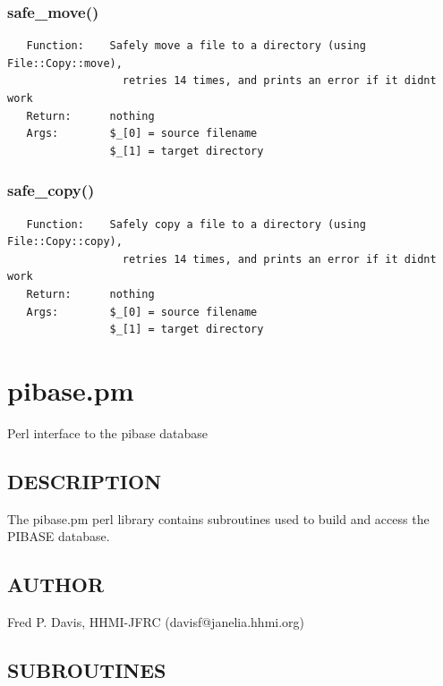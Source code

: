 \documentclass{article}
\begin{document}
\subsubsection*{safe\_move()\label{pibase_pm_safe_move_}}
\begin{verbatim}
   Function:    Safely move a file to a directory (using File::Copy::move),
                  retries 14 times, and prints an error if it didnt work
   Return:      nothing
   Args:        $_[0] = source filename
                $_[1] = target directory
\end{verbatim}
\subsubsection*{safe\_copy()\label{pibase_pm_safe_copy_}}
\begin{verbatim}
   Function:    Safely copy a file to a directory (using File::Copy::copy),
                  retries 14 times, and prints an error if it didnt work
   Return:      nothing
   Args:        $_[0] = source filename
                $_[1] = target directory
\end{verbatim}
\clearpage
\section{pibase.pm\label{pibase_pm}}


Perl interface to the pibase database

\subsection*{DESCRIPTION\label{pibase_pm_DESCRIPTION}}


The pibase.pm perl library contains subroutines used to build and access the
PIBASE database.

\subsection*{AUTHOR\label{pibase_pm_AUTHOR}}


Fred P. Davis, HHMI-JFRC (davisf@janelia.hhmi.org)

\subsection*{SUBROUTINES\label{pibase_pm_SUBROUTINES}}
\end{document}
